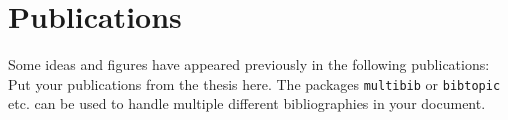 

\chapter*{Publications} %

Some ideas and figures have appeared previously in the following
publications:\\

\noindent Put your publications from the thesis here. The packages
\texttt{multibib} or \texttt{bibtopic} etc. can be used to handle multiple
different bibliographies in your document.


